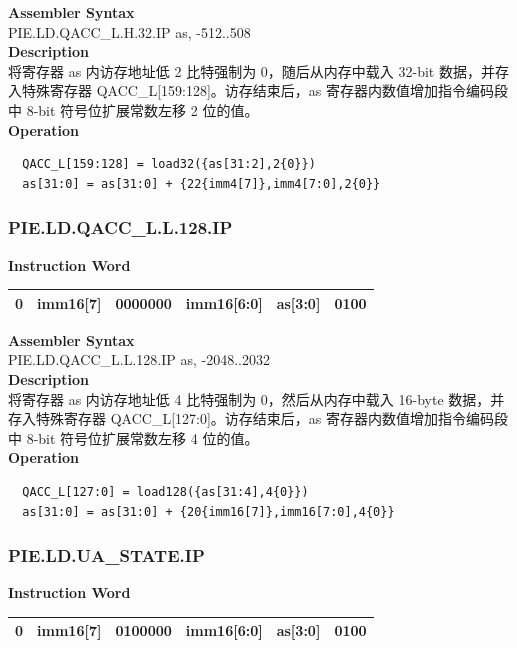 \textbf{Assembler Syntax} \\
PIE.LD.QACC\_L.H.32.IP as, -512..508 \\
\textbf{Description} \\
将寄存器 as 内访存地址低 2 比特强制为 0，随后从内存中载入 32-bit 数据，并存入特殊寄存器 QACC\_L[159:128]。访存结束后，as 寄存器内数值增加指令编码段中 8-bit 符号位扩展常数左移 2 位的值。\\
\textbf{Operation}
\begin{lstlisting}
  QACC_L[159:128] = load32({as[31:2],2{0}})
  as[31:0] = as[31:0] + {22{imm4[7]},imm4[7:0],2{0}}
\end{lstlisting}

\newpage
\subsubsection{PIE.LD.QACC\_L.L.128.IP}\label{instruction:PIELDQACCLL128IP}
\setlength\tabcolsep{6pt}
\textbf{Instruction Word} \\
\begin{tabular}{|c|c|c|c|c|c|}
	\hline
	0 & imm16[7] & 0000000 & imm16[6:0] & as[3:0] & 0100 \\
	\hline
\end{tabular}

\textbf{Assembler Syntax} \\
PIE.LD.QACC\_L.L.128.IP as, -2048..2032 \\
\textbf{Description} \\
将寄存器 as 内访存地址低 4 比特强制为 0，然后从内存中载入 16-byte 数据，并存入特殊寄存器 QACC\_L[127:0]。访存结束后，as 寄存器内数值增加指令编码段中 8-bit 符号位扩展常数左移 4 位的值。\\
\textbf{Operation}
\begin{lstlisting}
  QACC_L[127:0] = load128({as[31:4],4{0}})
  as[31:0] = as[31:0] + {20{imm16[7]},imm16[7:0],4{0}}
\end{lstlisting}

\newpage
\subsubsection{PIE.LD.UA\_STATE.IP}\label{instruction:PIELDUASTATEIP}
\setlength\tabcolsep{6pt}
\textbf{Instruction Word} \\
\begin{tabular}{|c|c|c|c|c|c|}
	\hline
	0 & imm16[7] & 0100000 & imm16[6:0] & as[3:0] & 0100 \\
	\hline
\end{tabular}

